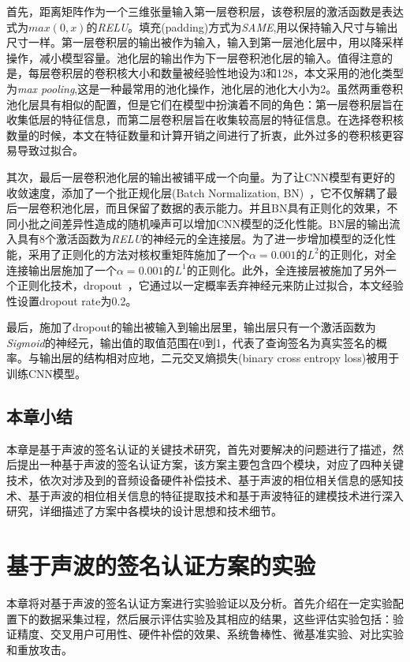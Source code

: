 首先，距离矩阵作为一个三维张量输入第一层卷积层，该卷积层的激活函数是表达式为$max(0,x)$的\textit{RELU}。填充(padding)方式为\textit{SAME},用以保持输入尺寸与输出尺寸一样。第一层卷积层的输出被作为输入，输入到第一层池化层中，用以降采样操作，减小模型容量。池化层的输出作为下一层卷积池化层的输入。值得注意的是，每层卷积层的卷积核大小和数量被经验性地设为3和128，本文采用的池化类型为\textit{max pooling},这是一种最常用的池化操作，池化层的池化大小为2。虽然两重卷积池化层具有相似的配置，但是它们在模型中扮演着不同的角色：第一层卷积层旨在收集低层的特征信息，而第二层卷积层旨在收集较高层的特征信息。在选择卷积核数量的时候，本文在特征数量和计算开销之间进行了折衷，此外过多的卷积核更容易导致过拟合。


其次，最后一层卷积池化层的输出被铺平成一个向量。为了让CNN模型有更好的收敛速度，添加了一个批正规化层(Batch Normalization, BN)~\cite{ioffe2015batch}，它不仅解耦了最后一层卷积池化层，而且保留了数据的表示能力。并且BN具有正则化的效果，不同小批之间差异性造成的随机噪声可以增加CNN模型的泛化性能。BN层的输出流入具有8个激活函数为\textit{RELU}的神经元的全连接层。为了进一步增加模型的泛化性能，采用了正则化的方法对核权重矩阵施加了一个$\alpha=0.001$的$L^2$的正则化，对全连接输出层施加了一个$\alpha=0.001$的$L^1$的正则化。此外，全连接层被施加了另外一个正则化技术，dropout~\cite{srivastava2014dropout}，它通过以一定概率丢弃神经元来防止过拟合，本文经验性设置dropout rate为0.2。

最后，施加了dropout的输出被输入到输出层里，输出层只有一个激活函数为\textit{Sigmoid}的神经元，输出值的取值范围在0到1，代表了查询签名为真实签名的概率。与输出层的结构相对应地，二元交叉熵损失(binary cross entropy loss)被用于训练CNN模型。

\section{本章小结}
本章是基于声波的签名认证的关键技术研究，首先对要解决的问题进行了描述，然后提出一种基于声波的签名认证方案，该方案主要包含四个模块，对应了四种关键技术，依次对涉及到的音频设备硬件补偿技术、基于声波的相位相关信息的感知技术、基于声波的相位相关信息的特征提取技术和基于声波特征的建模技术进行深入研究，详细描述了方案中各模块的设计思想和技术细节。


\chapter{基于声波的签名认证方案的实验}
本章将对基于声波的签名认证方案进行实验验证以及分析。首先介绍在一定实验配置下的数据采集过程，然后展示评估实验及其相应的结果，这些评估实验包括：验证精度、交叉用户可用性、硬件补偿的效果、系统鲁棒性、微基准实验、对比实验和重放攻击。

